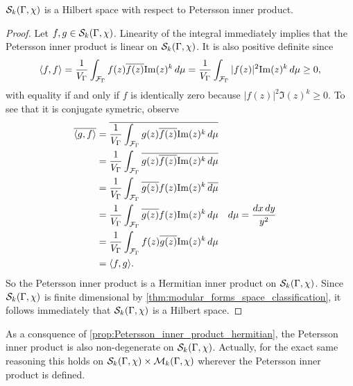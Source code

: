       \begin{proposition}\label{prop:Petersson_inner_product_hermitian}
        $\mathcal{S}_{k}(\Gamma,\chi)$ is a Hilbert space with respect to Petersson inner product.
      \end{proposition}
      \begin{proof}
        Let $f,g \in \mathcal{S}_{k}(\Gamma,\chi)$. Linearity of the integral immediately implies that the Petersson inner product is linear on $\mathcal{S}_{k}(\Gamma,\chi)$. It is also positive definite since
        \[
          \langle f,f\rangle = \frac{1}{V_{\Gamma}}\int_{\mathcal{F}_{\Gamma}}f(z)\overline{f(z)}\mathrm{Im}(z)^{k}\,d\mu = \frac{1}{V_{\Gamma}}\int_{\mathcal{F}_{\Gamma}}|f(z)|^{2}\mathrm{Im}(z)^{k}\,d\mu \ge 0,
        \]
        with equality if and only if $f$ is identically zero because $|f(z)|^{2}\Im(z)^{k} \ge 0$. To see that it is conjugate symetric, observe
        \begin{align*}
          \overline{\langle g,f\rangle} &= \overline{\frac{1}{V_{\Gamma}}\int_{\mathcal{F}_{\Gamma}}g(z)\overline{f(z)}\mathrm{Im}(z)^{k}\,d\mu} \\
          &= \frac{1}{V_{\Gamma}}\int_{\mathcal{F}_{\Gamma}}\overline{g(z)\overline{f(z)}\mathrm{Im}(z)^{k}\,d\mu} \\
          &= \frac{1}{V_{\Gamma}}\int_{\mathcal{F}_{\Gamma}}\overline{g(z)}f(z)\mathrm{Im}(z)^{k}\,\overline{d\mu} \\
          &= \frac{1}{V_{\Gamma}}\int_{\mathcal{F}_{\Gamma}}\overline{g(z)}f(z)\mathrm{Im}(z)^{k}\,d\mu && \text{$d\mu = \frac{dx\,dy}{y^{2}}$} \\
          &= \frac{1}{V_{\Gamma}}\int_{\mathcal{F}_{\Gamma}}f(z)\overline{g(z)}\mathrm{Im}(z)^{k}\,d\mu \\
          &= \langle f,g\rangle.
        \end{align*}
        So the Petersson inner product is a Hermitian inner product on $\mathcal{S}_{k}(\Gamma,\chi)$. Since $\mathcal{S}_{k}(\Gamma,\chi)$ is finite dimensional by \cref{thm:modular_forms_space_classification}, it follows immediately that $\mathcal{S}_{k}(\Gamma,\chi)$ is a Hilbert space.
      \end{proof}

      \begin{remark}\label{rem:non-degeneracy_of_Petersson_inner_product}
        As a consquence of \cref{prop:Petersson_inner_product_hermitian}, the Petersson inner product is also non-degenerate on $\mathcal{S}_{k}(\Gamma,\chi)$. Actually, for the exact same reasoning this holds on $\mathcal{S}_{k}(\Gamma,\chi) \times \mathcal{M}_{k}(\Gamma,\chi)$ wherever the Petersson inner product is defined.
      \end{remark}

